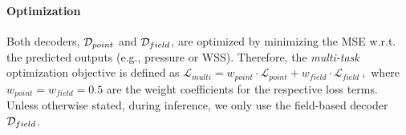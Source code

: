 \paragraph{Optimization}
Both decoders, $\mathcal{D}_{point}$ and $\mathcal{D}_{field}$, are optimized by minimizing the \ac{MSE} w.r.t. the predicted outputs (e.g., pressure or \ac{WSS}).
Therefore, the \emph{multi-task} optimization objective is defined as $
    \mathcal{L}_{multi} = w_{point} \cdot \mathcal{L}_{point} +  w_{field} \cdot \mathcal{L}_{field} \ ,
$
where $w_{point}=w_{field}=0.5$ are the weight coefficients for the respective loss terms. 
Unless otherwise stated, during inference, we only use the field-based decoder $\mathcal{D}_{field}$.
